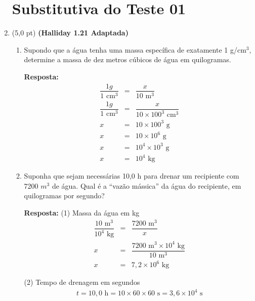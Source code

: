 \documentclass[12pt,a4paper,oneside]{article}
\begin{document}
\begin{enumerate}
	
	\section*{Substitutiva do Teste 01}

\item (5,0 pt) {\bf (Halliday 1.21 Adaptada)} 
\begin{enumerate}
	\item Supondo que a água tenha uma massa específica de exatamente 1 g/$\mbox{cm}^3$, determine a massa de dez metros cúbicos de água em quilogramas.
	
	\vspace*{0.3cm}
	
	{\color{blue} {\bf Resposta:} 
		\begin{eqnarray*}
			\dfrac{1 g}{1 \mbox{ cm}^3} & = & \dfrac{x}{10 \mbox{ m}^3}	\\
			\dfrac{1 g}{1 \mbox{ cm}^3} & = & \dfrac{x}{10 \times 100^3 \mbox{ cm}^3}	\\
			x & = & 10 \times 100^3 \mbox{ g} \\
			x & = & 10 \times 10^6 \mbox{ g} \\
			x & = & 10^4 \times 10^3 \mbox{ g}\\
			x & = & 10^4 \mbox{ kg}
		\end{eqnarray*}
	}

	\item Suponha que sejam necessárias 10,0 h para drenar um recipiente com 7200 $m^3$ de água. Qual é a ``vazão mássica'' da água do recipiente, em quilogramas por segundo?
	
	\vspace*{0.3cm}
	
	{\color{blue} {\bf Resposta:} (1) Massa da água em kg
		\begin{eqnarray*}
			\dfrac{10 \mbox{ m}^3}{10^4 \mbox{ kg}} & = & \dfrac{7200 \mbox{ m}^3}{x}	\\
			x{} & = & \dfrac{7200 \mbox{ m}^3 \times 10^4 \mbox{ kg}}{10 \mbox{ m}^3}	\\
			x & = & 7,2 \times 10^6  \mbox{ kg}
		\end{eqnarray*}
		
		(2) Tempo de drenagem em segundos
		\begin{eqnarray*}
			t = 10,0 \mbox{ h} = 10 \times 60 \times 60 \mbox{ s}	=  3,6 \times 10^4 \mbox{ s}
		\end{eqnarray*}
		
}
\end{enumerate}
\end{enumerate}
\end{document}
